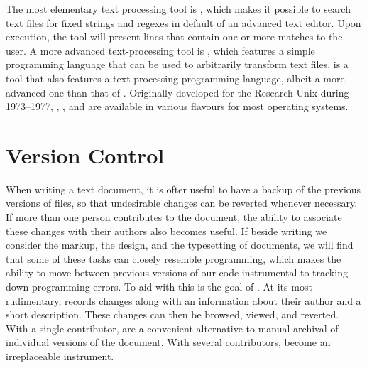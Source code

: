\documentclass[a5paper,10pt]{book}
\begin{document}

The most elementary text processing  tool is ,
which makes it possible to search text files for fixed strings and regexes in
default of an advanced text editor. Upon execution, the tool will present lines
that contain one or more matches to the user. A more advanced text-processing
 tool is , which features a simple programming
language that can be used to arbitrarily transform text files.  is
a  tool that also features a text-processing programming
language, albeit a more advanced one than that of . Originally
developed for the Research Unix during 1973--1977, , ,
and  are available in various flavours for most operating systems.



\section{Version Control}\label{sec:vcs}
When writing a text document, it is ofter useful to have a backup of the
previous versions of files, so that undesirable changes can be reverted whenever
necessary. If more than one person contributes to the document, the ability to
associate these changes with their authors also becomes useful. If beside
writing we consider the markup, the design, and the typesetting of documents, we
will find that some of these tasks can closely resemble programming, which makes
the ability to move between previous versions of our code instrumental to
tracking down programming errors. To aid with this is the goal of .
At its most rudimentary,  records changes along with an information
about their author and a short description. These changes can then be browsed,
viewed, and reverted. With a single contributor,  are a convenient
alternative to manual archival of individual versions of the document. With
several contributors,  become an irreplaceable instrument.
\end{document}
